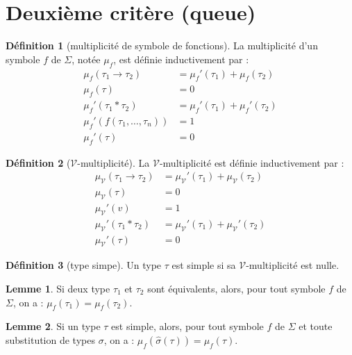 \documentclass [a4paper] {report}
\theoremstyle {definition}
\newtheorem {definition} {Définition} [section]
\newtheorem {lemme} {Lemme} [section]
\newcommand {\V} {\mathscr V}
\begin{document}

\section {Deuxième critère (queue)}

\begin {definition} [multiplicité de symbole de fonctions]
	La multiplicité d'un symbole $f$ de $\Sigma$, notée $\mu_f$, est définie inductivement par :
	\begin {align*}
		\mu_f (\tau_1 \rightarrow \tau_2) &= \mu_f' (\tau_1) + \mu_f (\tau_2) \\
		\mu_f (\tau) &= 0 \\
		\mu_f' (\tau_1 * \tau_2) &= \mu_f' (\tau_1) + \mu_f' (\tau_2) \\
		\mu_f' (f (\tau_1, \dots, \tau_n)) &= 1 \\
		\mu_f' (\tau) &= 0
	\end {align*}
\end {definition}

\begin {definition} [$\V$-multiplicité]
	La $\V$-multiplicité est définie inductivement par :
	\begin {align*}
		\mu_\V (\tau_1 \rightarrow \tau_2) &= \mu_\V' (\tau_1) + \mu_\V (\tau_2) \\
		\mu_\V (\tau) &= 0 \\
		\mu_\V' (v) &= 1 \\
		\mu_\V' (\tau_1 * \tau_2) &= \mu_\V' (\tau_1) + \mu_\V' (\tau_2) \\
		\mu_\V' (\tau) &= 0
	\end {align*}
\end {definition}

\begin {definition} [type simpe]
	Un type $\tau$ est simple si sa $\V$-multiplicité est nulle.
\end {definition}

\begin {lemme} \label {mu-=E}
	Si deux type $\tau_1$ et $\tau_2$ sont équivalents, alors, pour tout symbole $f$ de $\Sigma$, on a : $\mu_f (\tau_1) = \mu_f (\tau_2)$.
\end {lemme}

\begin {lemme} \label {mu-subst-simple}
	Si un type $\tau$ est simple, alors, pour tout symbole $f$ de $\Sigma$ et toute substitution de types $\sigma$, on a : $\mu_f (\hat \sigma (\tau)) = \mu_f (\tau)$.
\end {lemme}
\end{document}
